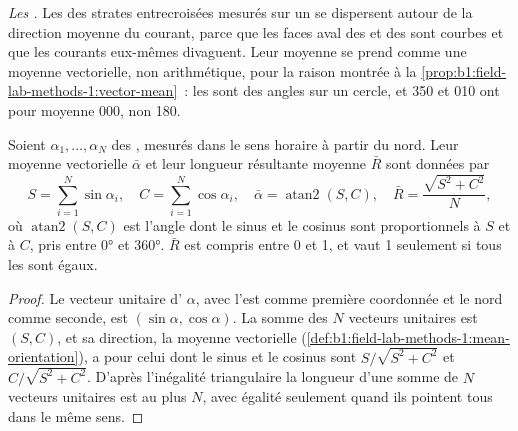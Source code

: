 \emph{Les .} Les  des strates entrecroisées mesurés sur un 
se dispersent autour de la direction moyenne du courant, parce que les faces aval des
 et des  sont courbes et que les courants eux-mêmes divaguent. Leur moyenne se
prend comme une moyenne vectorielle, non arithmétique, pour la raison montrée à la
\cref{prop:b1:field-lab-methods-1:vector-mean}~: les  sont des angles sur un
cercle, et 350 et 010 ont pour moyenne 000, non 180.

\begin{proposition}\label{prop:b1:clastic-sediments:azimuths}
Soient $\alpha_1, \ldots, \alpha_N$ des , mesurés dans le sens horaire à partir du nord.
Leur moyenne vectorielle $\bar\alpha$ et leur longueur résultante moyenne $\bar R$ sont
données par
\[
  S = \sum_{i=1}^N \sin\alpha_i, \quad C = \sum_{i=1}^N \cos\alpha_i, \quad
  \bar\alpha = \operatorname{atan2}(S, C), \quad \bar R = \frac{\sqrt{S^2 + C^2}}{N},
\]
où $\operatorname{atan2}(S, C)$ est l'angle dont le sinus et le cosinus sont
proportionnels à $S$ et à $C$, pris entre \ang{0} et \ang{360}. $\bar R$ est compris
entre 0 et 1, et vaut 1 seulement si tous les  sont égaux.
\end{proposition}

\begin{proof}
Le vecteur unitaire d' $\alpha$, avec l'est comme première coordonnée et le nord
comme seconde, est $(\sin\alpha, \cos\alpha)$. La somme des $N$ vecteurs unitaires est
$(S, C)$, et sa direction, la moyenne vectorielle
(\cref{def:b1:field-lab-methods-1:mean-orientation}), a pour  celui dont le
sinus et le cosinus sont $S/\sqrt{S^2+C^2}$ et $C/\sqrt{S^2+C^2}$. D'après l'inégalité
triangulaire la longueur d'une somme de $N$ vecteurs unitaires est au plus $N$, avec égalité
seulement quand ils pointent tous dans le même sens.
\end{proof}

